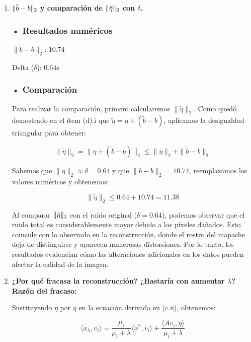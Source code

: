 \documentclass{article}
\begin{document}
\begin{enumerate}[label=\roman*., widest=iii]
  \item \textbf{$\lVert\tilde{b} - b\rVert_2$ y comparación de $\lVert\tilde{\eta}\rVert_2$ con $\delta$.}

  \subsubsection*{• Resultados numéricos}

  \(\|\tilde{b} - b\|_2\): 10.74

  Delta (\(\delta\)): 0.64s
  
  \subsubsection*{• Comparación}

  Para realizar la comparación, primero calcularemos \(\|\tilde{\eta}\|_2\). Como quedó demostrado en el ítem (d).i que \(\tilde{\eta}=\eta+(\tilde b-b)\), aplicamos la desigualdad triangular para obtener:

  \[
  \|\tilde{\eta}\|_2 = \|\eta + (\tilde{b} - b)\|_2 \le \|\eta\|_2 + \|\tilde{b} - b\|_2
  \]

  Sabemos que \(\|\eta\|_2 \approx \delta = 0.64\) y que \(\|\tilde{b} - b\|_2= 10.74\), reemplazamos los valores numéricos y obtenemos:

  \[
  \boxed{\|\tilde{\eta}\|_2 \le 0.64 + 10.74 = 11.38}
  \]

  Al comparar \(\lVert\tilde{\eta}\rVert_2\) con el ruido original (\(\delta=0.64\)), podemos observar que el ruido total es considerablemente mayor debido a los píxeles dañados. Esto coincide con lo observado en la reconstrucción, donde el rostro del mapache deja de distinguirse y aparecen numerosas distorsiones. Por lo tanto, los resultados evidencian cómo las alteraciones adicionales en los datos pueden afectar la calidad de la imagen.

  \item \textbf{¿Por qué fracasa la reconstrucción? ¿Bastaría con aumentar $\lambda$?}\\

  \textbf{Razón del fracaso:}

  Sustituyendo $\eta$ por $\tilde{\eta}$ en la ecuación derivada en (c.ii), obtenemos:
  
\begin{equation*}
    \langle x_\lambda, v_i \rangle = \frac{\mu_i}{\mu_i + \lambda} \langle x^*, v_i \rangle + \frac{\langle A v_i, \tilde{\eta} \rangle}{\mu_i + \lambda}
\end{equation*}


\end{enumerate}
\end{document}
